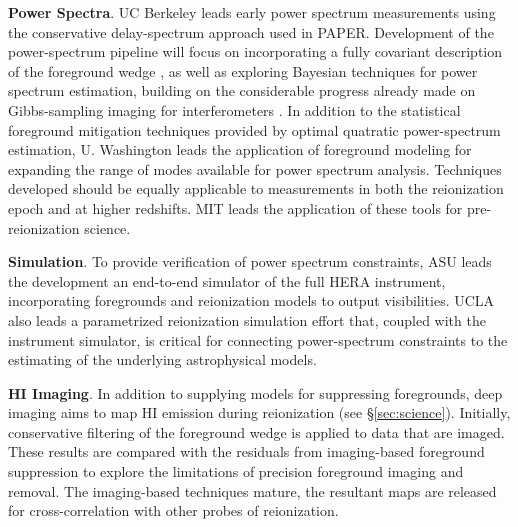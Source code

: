 \documentclass[preprint]{aastex}
\newcommand{\Mycitep}[1]{{\bf \citep{#1}}}
\newcommand{\compress}{\vspace{-0.25in}}
\begin{document}


{\bf Power Spectra}. UC Berkeley leads early power spectrum measurements using the conservative
delay-spectrum approach used in PAPER.  %
Development of
the power-spectrum pipeline will focus on incorporating
a fully covariant description of the foreground wedge
\Mycitep{liu_tegmark2011,dillon_et_al2013a}, as well as
exploring Bayesian techniques for power spectrum estimation, building on the considerable
progress already made on Gibbs-sampling imaging for interferometers \Mycitep{sutter_et_al2014}.
In addition to the statistical foreground mitigation techniques provided by optimal quatratic
power-spectrum estimation, U. Washington leads the application of 
foreground modeling for expanding the range of modes available for power spectrum analysis.
Techniques developed should be equally applicable
to measurements in both the reionization epoch and at higher redshifts.  MIT leads the application
of these tools for pre-reionization science.

{\bf Simulation}. To provide verification of power spectrum constraints, ASU leads the
development an end-to-end simulator of the full HERA instrument, incorporating
foregrounds and reionization models to output visibilities.  UCLA also leads
a parametrized reionization simulation effort that, coupled with the instrument
simulator, is critical for connecting power-spectrum constraints to the estimating
of the underlying astrophysical models.


{\bf HI Imaging}. In addition to supplying models for suppressing foregrounds,
deep imaging aims to map HI emission during reionization (see \S\ref{sec:science}).
Initially, conservative filtering of the foreground wedge is applied to data that
are imaged.  These results are compared with the residuals from imaging-based
foreground suppression to explore the limitations of 
precision foreground imaging and removal.  The imaging-based techniques mature, the resultant
maps are released for cross-correlation with other probes of reionization.
\end{document}
